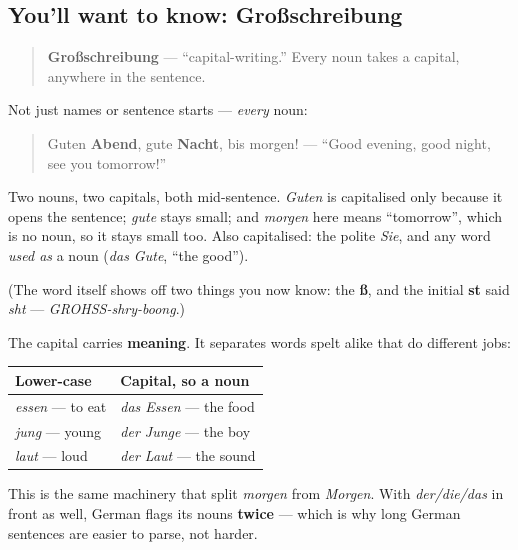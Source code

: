 \subsection*{You'll want to know: Großschreibung}
\begin{quote}
\textbf{Großschreibung} — \textquotedblleft{}capital-writing.\textquotedblright{} Every noun takes a capital, anywhere in the sentence.
\end{quote}

Not just names or sentence starts — \emph{every} noun:

\begin{quote}
Guten \textbf{Abend}, gute \textbf{Nacht}, bis morgen! — \textquotedblleft{}Good evening, good night, see you tomorrow!\textquotedblright{}
\end{quote}

Two nouns, two capitals, both mid-sentence. \emph{Guten} is capitalised only because it opens the sentence; \emph{gute} stays small; and \emph{morgen} here means \textquotedblleft{}tomorrow\textquotedblright{}, which is no noun, so it stays small too. Also capitalised: the polite \emph{Sie}, and any word \emph{used as} a noun (\emph{das Gute}, \textquotedblleft{}the good\textquotedblright{}).

(The word itself shows off two things you now know: the \textbf{ß}, and the initial \textbf{st} said \emph{sht} — \emph{GROHSS-shry-boong}.)

\begin{grammarlens}[title={Grammar Lens: the capital is a part-of-speech signal}]
The capital carries \textbf{meaning}. It separates words spelt alike that do different jobs:

\noindent
\begin{tabularx}{\linewidth}{@{}>{\raggedright\arraybackslash}X>{\raggedright\arraybackslash}X@{}}
\toprule
\textbf{Lower-case} & \textbf{Capital, so a noun} \\
\midrule
\emph{essen} — to eat & \emph{das Essen} — the food \\
\emph{jung} — young & \emph{der Junge} — the boy \\
\emph{laut} — loud & \emph{der Laut} — the sound \\
\bottomrule
\end{tabularx}

This is the same machinery that split \emph{morgen} from \emph{Morgen}. With \emph{der/die/das} in front as well, German flags its nouns \textbf{twice} — which is why long German sentences are easier to parse, not harder.
\end{grammarlens}

